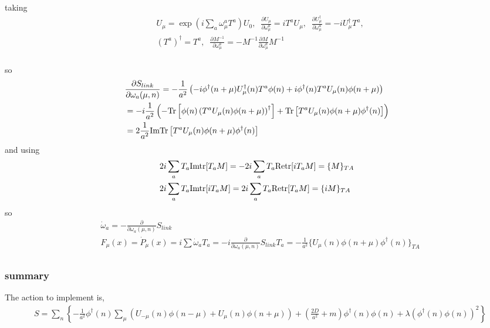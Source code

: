 taking
\begin{equation}
\begin{split}
&U_{\mu}=\exp (i\sum _a \omega _{\mu}^a T^a)U_0,\;\;\frac{\partial U_{\mu}}{\partial \omega_{\mu}^a}=iT^aU_{\mu},\;\;\frac{\partial U^{\dagger}_{\mu}}{\partial \omega_{\mu}^a}=-iU^{\dagger}_{\mu}T^a,\\
&\left(T^a\right)^{\dagger}=T^a,\;\;\frac{\partial M^{-1}}{\partial \omega _{\mu}^a}=-M^{-1}\frac{\partial M}{\partial \omega _{\mu}^a}M^{-1}\\
\end{split}
\end{equation}

so
\begin{equation}
\begin{split}
&\frac{\partial S_{link}}{\partial \omega _a(\mu,n)} = -\frac{1}{a^2} \left(-i\phi^{\dagger}(n+\mu) U_{\mu}^{\dagger}(n)T^a\phi(n)+ i\phi^{\dagger} (n)T^aU_{\mu}(n)\phi(n+\mu)\right) \\
&=-i\frac{1}{a^2}\left(-{\rm Tr}\left[\phi(n)\left(T^aU_{\mu}(n)\phi(n+\mu)\right)^{\dagger}\right]+ {\rm Tr}\left[T^aU_{\mu}(n)\phi(n+\mu)\phi^{\dagger} (n)\right]\right) \\
&=2\frac{1}{a^2}{\rm ImTr}\left[T^aU_{\mu}(n)\phi(n+\mu)\phi^{\dagger} (n)\right]\\
\end{split}
\end{equation}
and using
\begin{equation}
\begin{split}
&2i \sum _a T_a {\rm Im tr}[T_a M] = -2 i \sum _a T_a {\rm Re tr}[i T_a M] = \{M\}_{TA}\\
&2i \sum _a T_a {\rm Im tr}[i T_a M] = 2 i \sum _a T_a {\rm Re tr}[T_a M] = \{i M\}_{TA}\\
\end{split}
\end{equation}
so
\begin{equation}
\begin{split}
&\dot{\omega} _a=-\frac{\partial}{\partial \omega _a (\mu,n)}S_{link}\\
&F_{\mu}(x)=\dot{P}_{\mu}(x)=i\sum \dot{\omega}_a T_a=-i\frac{\partial}{\partial \omega _a (\mu,n)}S_{link} T_a=-\frac{1}{a^2}\{U_{\mu}(n)\phi(n+\mu)\phi^{\dagger} (n)\}_{TA}\\
\end{split}
\end{equation}

\subsubsection{\label{sec:bosonandgaugesummary}summary}

The action to implement is,
\begin{equation}
\begin{split}
&S=\sum _n\left\{-\frac{1}{a^2}\phi^{\dagger}(n) \sum _{\mu}\left(U_{-\mu}(n)\phi(n-\mu)+U_{\mu}(n)\phi(n+\mu)\right) + \left(\frac{2D}{a^2} +m\right)\phi^{\dagger}(n)\phi(n) + \lambda \left(\phi^{\dagger}(n)\phi(n)\right)^2\right\}\\
\end{split}
\end{equation}